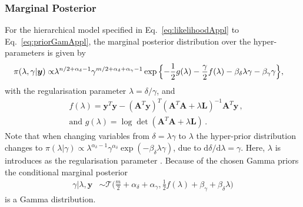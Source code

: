 \documentclass{article}
\begin{document}
\subsubsection{Marginal Posterior}
\label{subsec:FirstMargPost}
For the hierarchical model specified in Eq.~\ref{eq:likelihoodAppl} to Eq.~\ref{eq:priorGamAppl}, the marginal posterior distribution over the hyper-parameters is given by
\begin{align}
	\pi( \lambda,\gamma  | \bm{y}) \propto &  \lambda^{n/2 + \alpha_{\delta}-1} \gamma^{m/2 + \alpha_{\delta} + \alpha_{\gamma}-1}   \exp{ \Bigl\{ - \frac{1}{2} g ( \lambda) - \frac{\gamma}{2} f ( \lambda) - \beta_{\delta} \lambda  \gamma - \beta_{\gamma} \gamma \Bigr\}},
	\label{eq:MargPostTheo}
\end{align}
with the regularisation parameter $\lambda = \delta / \gamma$, and
\begin{subequations}
	\begin{align}
		&f ( \lambda) = \bm{y}^T \bm{y} - (\bm{A}^T \bm{y})^T (\bm{A}^T  \bm{A} + \lambda \bm{L})^{-1} \bm{A}^T \bm{y}  \label{eq:fAppl} \, ,  \\
		&\text{and } g(\lambda) = \log \det (\bm{A}^T  \bm{A} + \lambda \bm{L}) \label{eq:gAppl} \, .
	\end{align}
\end{subequations}
Note that when changing variables from $\delta = \lambda \gamma$ to $\lambda$ the hyper-prior distribution changes to $\pi(\lambda | \gamma) \propto \lambda^{\alpha_{\delta}-1} \gamma^{\alpha_{\delta}} \exp{(- \beta_{\delta} \lambda  \gamma)} $, due to $\text{d}\delta / \text{d} \lambda = \gamma$.
Here, $\lambda$ is introduces as the regularisation parameter \cite{fox2016fast}.
Because of the chosen Gamma priors the conditional marginal posterior 
\begin{align}
	\gamma |  \lambda, \bm{y} &\sim \mathcal{T}\bigg( \frac{m}{2} + \alpha_\delta + \alpha_\gamma, \frac{1}{2} f (\lambda) + \beta_\gamma + \beta_\delta \lambda \bigg)\label{eq:GibbsStep}
\end{align} 
is a Gamma distribution.
\end{document}
